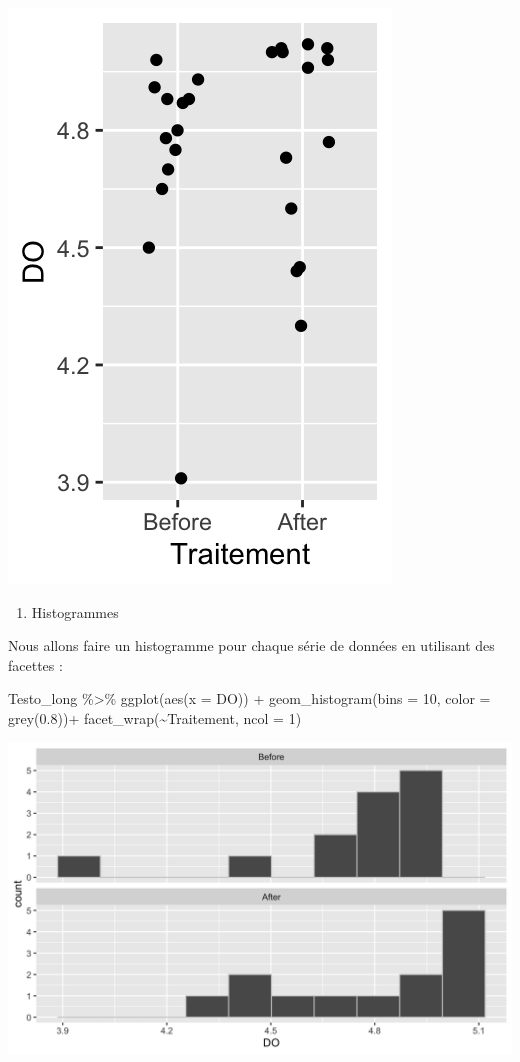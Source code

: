 \documentclass[
  a4paper,
]{article}
\newenvironment{Shaded}{\begin{snugshade}}{\end{snugshade}}
\newcommand{\AttributeTok}[1]{\textcolor[rgb]{0.00,0.34,0.68}{#1}}
\newcommand{\DecValTok}[1]{\textcolor[rgb]{0.69,0.50,0.00}{#1}}
\newcommand{\FloatTok}[1]{\textcolor[rgb]{0.69,0.50,0.00}{#1}}
\newcommand{\FunctionTok}[1]{\textcolor[rgb]{0.39,0.29,0.61}{#1}}
\newcommand{\NormalTok}[1]{\textcolor[rgb]{0.12,0.11,0.11}{#1}}
\newcommand{\SpecialCharTok}[1]{\textcolor[rgb]{0.24,0.68,0.91}{#1}}
\providecommand{\tightlist}{%
  \setlength{\itemsep}{0pt}\setlength{\parskip}{0pt}}
\begin{document}
\begin{center}\includegraphics[width=0.25\linewidth]{figure/unnamed-chunk-32-1} \end{center}

\begin{enumerate}
\def\labelenumi{\arabic{enumi}.}
\setcounter{enumi}{1}
\tightlist
\item
  Histogrammes
\end{enumerate}

Nous allons faire un histogramme pour chaque série de données en utilisant des facettes :

\begin{Shaded}
\begin{Highlighting}[]
\NormalTok{Testo\_long }\SpecialCharTok{\%\textgreater{}\%} 
  \FunctionTok{ggplot}\NormalTok{(}\FunctionTok{aes}\NormalTok{(}\AttributeTok{x =}\NormalTok{ DO)) }\SpecialCharTok{+}
  \FunctionTok{geom\_histogram}\NormalTok{(}\AttributeTok{bins =} \DecValTok{10}\NormalTok{, }\AttributeTok{color =} \FunctionTok{grey}\NormalTok{(}\FloatTok{0.8}\NormalTok{))}\SpecialCharTok{+}
  \FunctionTok{facet\_wrap}\NormalTok{(}\SpecialCharTok{\textasciitilde{}}\NormalTok{Traitement, }\AttributeTok{ncol =} \DecValTok{1}\NormalTok{)}
\end{Highlighting}
\end{Shaded}

\begin{center}\includegraphics[width=0.9\linewidth]{figure/unnamed-chunk-33-1} \end{center}
\end{document}
